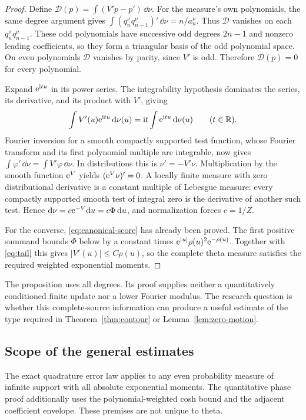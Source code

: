 \begin{proof}
Define \(\mathcal D(p)=\int(V'p-p')\,\dd\nu\).
For the measure's own polynomials, the same degree argument gives
\(\int(q_n^\nu q_{n-1}^\nu)'\,\dd\nu=n/a_n^\nu\).
Thus \(\mathcal D\) vanishes on each \(q_n^\nu q_{n-1}^\nu\).
These odd polynomials have successive odd degrees \(2n-1\) and
nonzero leading coefficients, so they form a triangular basis of
the odd polynomial space. On even polynomials \(\mathcal D\)
vanishes by parity, since \(V'\) is odd. Therefore
\(\mathcal D(p)=0\) for every polynomial.

Expand \(\mathrm e^{\mathrm i tu}\) in its power series. The integrability
hypothesis dominates the series, its derivative, and its product
with \(V'\), giving
\[
 \int V'(u)\mathrm e^{\mathrm i tu}\,\mathrm d\nu(u)
     =\mathrm i t\int\mathrm e^{\mathrm i tu}\,\mathrm d\nu(u)\qquad(t\in\mathbb R).
\]
Fourier inversion for a smooth compactly supported test function,
whose Fourier transform and its first polynomial multiple are
integrable, now gives
\(\int\varphi'\,\dd\nu=\int V'\varphi\,\dd\nu\).
In distributions this is \(\nu'=-V'\nu\). Multiplication by
the smooth function \(\mathrm e^V\) yields \((\mathrm e^V\nu)'=0\).
A locally finite measure with zero distributional derivative is a
constant multiple of Lebesgue measure: every compactly supported
smooth test of integral zero is the derivative of another such test.
Hence \(\mathrm d\nu=c\mathrm e^{-V}\mathrm d u=c\Phi\,\mathrm d u\), and normalization
forces \(c=1/Z\).

For the converse, \eqref{eq:canonical-score} has already been proved.
The first positive summand bounds \(\Phi\) below by a constant times
\(\mathrm e^{|u|}\rho(u)^2\mathrm e^{-\rho(u)}\). Together with
\eqref{eq:tail} this gives \(|V'(u)|\le C\rho(u)\), so the complete
theta measure satisfies the required weighted exponential moments.
\end{proof}

The proposition uses all degrees. Its proof supplies neither a
quantitatively conditioned finite update nor a lower Fourier modulus.
The research question is whether this complete-source information
can produce a useful estimate of the type required in
Theorem~\ref{thm:contour} or Lemma~\ref{lem:zero-motion}.

\subsection{Scope of the general estimates}

The exact quadrature error law applies to any even probability
measure of infinite support with all absolute exponential moments.
The quantitative phase proof additionally uses the polynomial-weighted
cosh bound and the adjacent coefficient envelope. These premises
are not unique to theta.

